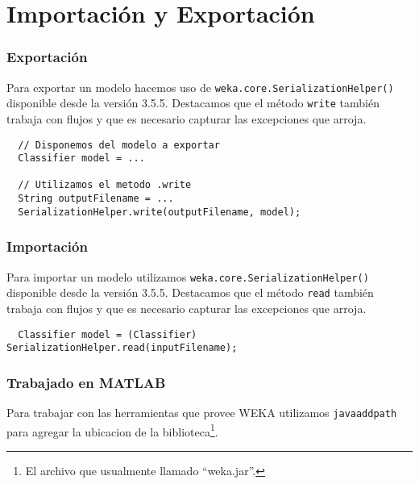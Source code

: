 \documentclass[10pt,a4paper]{article}
\begin{document}

\part{Importación y Exportación}
\section{Exportación}
Para exportar un modelo hacemos uso de \lstinline{weka.core.SerializationHelper()} disponible desde la versión 3.5.5. Destacamos que el método \lstinline{write} también trabaja con flujos y que es necesario capturar las excepciones que arroja.
\begin{lstlisting}
  // Disponemos del modelo a exportar
  Classifier model = ...
  
  // Utilizamos el metodo .write
  String outputFilename = ...
  SerializationHelper.write(outputFilename, model);
\end{lstlisting}

\section{Importación}
Para importar un modelo utilizamos \lstinline{weka.core.SerializationHelper()} disponible desde la versión 3.5.5. Destacamos que el método \lstinline{read} también trabaja con flujos y que es necesario capturar las excepciones que arroja.
\begin{lstlisting}
  Classifier model = (Classifier) SerializationHelper.read(inputFilename);
\end{lstlisting}

\section{Trabajado en MATLAB}
Para trabajar con las herramientas que provee WEKA utilizamos \lstinline{javaaddpath} para agregar la ubicacion de la biblioteca\footnote{El archivo que usualmente llamado ``weka.jar''.}.
\printbibliography
\end{document}
